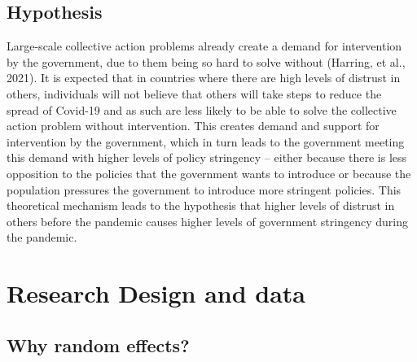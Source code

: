 \documentclass[
  11pt,
]{article}
\begin{document}
\hypertarget{hypothesis}{%
\subsection{Hypothesis}\label{hypothesis}}

Large-scale collective action problems already create a demand for intervention by the government, due to them being so hard to solve without (Harring, et al., 2021). It is expected that in countries where there are high levels of distrust in others, individuals will not believe that others will take steps to reduce the spread of Covid-19 and as such are less likely to be able to solve the collective action problem without intervention. This creates demand and support for intervention by the government, which in turn leads to the government meeting this demand with higher levels of policy stringency -- either because there is less opposition to the policies that the government wants to introduce or because the population pressures the government to introduce more stringent policies. This theoretical mechanism leads to the hypothesis that higher levels of distrust in others before the pandemic causes higher levels of government stringency during the pandemic.\\

\hypertarget{research-design-and-data}{%
\section{Research Design and data}\label{research-design-and-data}}

\hypertarget{why-random-effects}{%
\subsection{Why random effects?}\label{why-random-effects}}
\end{document}
